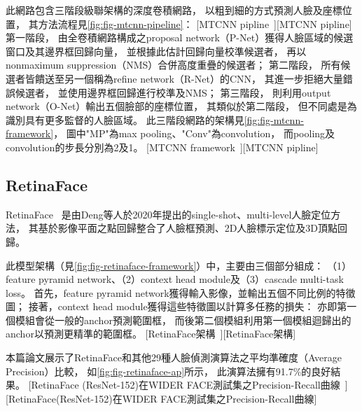 \documentclass[class=NCU_thesis, crop=false]{standalone}
\begin{document}
此網路包含三階段級聯架構的深度卷積網路，
以粗到細的方式預測人臉及座標位置，
其方法流程見\cref{fig:fig-mtcnn-pipeline}：
[MTCNN pipline~\cite{zhang_joint_2016}][MTCNN pipline]
第一階段，
由全卷積網路構成之proposal network（P-Net）獲得人臉區域的候選窗口及其邊界框回歸向量，
並根據此估計回歸向量校準候選者，
再以nonmaximum suppression（NMS）合併高度重疊的候選者；
第二階段，
所有候選者皆饋送至另一個稱為refine network（R-Net）的CNN，
其進一步拒絕大量錯誤候選者，
並使用邊界框回歸進行校準及NMS；
第三階段，
則利用output network（O-Net）輸出五個臉部的座標位置，
其類似於第二階段，
但不同處是為識別具有更多監督的人臉區域。
此三階段網路的架構見\cref{fig:fig-mtcnn-framework}，
圖中"MP"為max pooling、"Conv"為convolution，
而pooling及convolution的步長分別為2及1。
[MTCNN framework~\cite{zhang_joint_2016}][MTCNN pipline]

\subsection{RetinaFace}
RetinaFace~\cite{deng_retinaface_2020}
是由Deng等人於2020年提出的single-shot、multi-level人臉定位方法，
其基於影像平面之點回歸整合了人臉框預測、2D人臉標示定位及3D頂點回歸。

此模型架構（見\cref{fig:fig-retinaface-framework}）中，主要由三個部分組成：
（1）feature pyramid network、（2）context head module及（3）cascade multi-task loss。
首先，feature pyramid network獲得輸入影像，並輸出五個不同比例的特徵圖；
接著，context head module獲得這些特徵圖以計算多任務的損失：
亦即第一個模組會從一般的anchor預測範圍框，
而後第二個模組利用第一個模組迴歸出的anchor以預測更精準的範圍框。
[RetinaFace架構~\cite{deng_retinaface_2020}][RetinaFace架構]

本篇論文展示了RetinaFace和其他29種人臉偵測演算法之平均準確度（Average Precision）比較，
如\cref{fig:fig-retinaface-ap}所示，
此演算法擁有91.7\%的良好結果。
[RetinaFace (ResNet-152)在WIDER FACE測試集之Precision-Recall曲線~\cite{deng_retinaface_2020}][RetinaFace(ResNet-152)在WIDER FACE測試集之Precision-Recall曲線]
\end{document}
